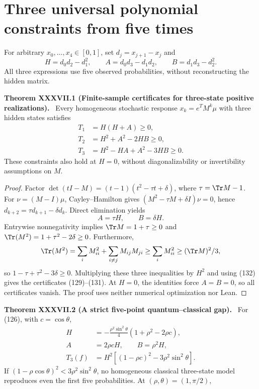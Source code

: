 \documentclass[11pt,a4paper,oneside]{book}
\newcommand{\statement}[3]{\par\medskip\noindent\textbf{#1 #2 (#3).}\ }
\begin{document}
\section{Three universal polynomial constraints from five times}
For arbitrary $x_0,\ldots,x_4\in[0,1]$, set $d_j=x_{j+1}-x_j$ and
\begin{equation}H=d_0d_2-d_1^2,\qquad A=d_0d_3-d_1d_2,\qquad B=d_1d_3-d_2^2.\tag{128}\end{equation}
All three expressions use five observed probabilities, without reconstructing the hidden matrix.
\statement{Theorem}{XXXVII.1}{Finite-sample certificates for three-state positive realizations}
Every homogeneous stochastic response $x_k=e^TM^k\mu$ with three hidden states satisfies
\begin{align}T_1&=H(H+A)\ge0,\tag{129}\\T_2&=H^2+A^2-2HB\ge0,\tag{130}\\T_3&=H^2-HA+A^2-3HB\ge0.\tag{131}\end{align}
These constraints also hold at $H=0$, without diagonalizability or invertibility assumptions on $M$.
\begin{proof}
Factor $\det(tI-M)=(t-1)(t^2-\tau t+\delta)$, where $\tau=\Tr M-1$. For $\nu=(M-I)\mu$, Cayley--Hamilton gives $(M^2-\tau M+\delta I)\nu=0$, hence $d_{k+2}=\tau d_{k+1}-\delta d_k$. Direct elimination yields
\begin{equation}A=\tau H,\qquad B=\delta H.\tag{132}\end{equation}
Entrywise nonnegativity implies $\Tr M=1+\tau\ge0$ and $\Tr(M^2)=1+\tau^2-2\delta\ge0$. Furthermore,
\[\Tr(M^2)=\sum_iM_{ii}^2+\sum_{i\ne j}M_{ij}M_{ji}\ge\sum_iM_{ii}^2\ge(\Tr M)^2/3,\]
so $1-\tau+\tau^2-3\delta\ge0$. Multiplying these three inequalities by $H^2$ and using (132) gives the certificates (129)--(131). At $H=0$, the identities force $A=B=0$, so all certificates vanish. The proof uses neither numerical optimization nor Lean.
\end{proof}
\statement{Theorem}{XXXVII.2}{A strict five-point quantum--classical gap}
For (126), with $c=\cos\theta$,
\begin{align}H&=-\frac{\rho^2\sin^2\theta}{4}(1+\rho^2-2\rho c),\tag{133}\\A&=2\rho cH,\qquad B=\rho^2H,\tag{134}\\T_3(f)&=H^2[(1-\rho c)^2-3\rho^2\sin^2\theta].\tag{135}\end{align}
If $(1-\rho\cos\theta)^2<3\rho^2\sin^2\theta$, no homogeneous classical three-state model reproduces even the first five probabilities. At $(\rho,\theta)=(1,\pi/2)$,
\end{document}
